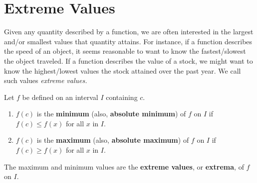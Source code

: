 \section{Extreme Values}\label{sec:extreme_values}


Given any quantity described by a function, we are often interested in the largest and/or smallest values that quantity attains. For instance, if a function describes the speed of an object, it seems reasonable to want to know the fastest/slowest the object traveled. If a function describes the value of a stock, we might want to know the highest/lowest values the stock attained over the past year. We call such values \emph{extreme values.}

\begin{definition}\label{def:extreme_values}%
Let $f$ be defined on an interval $I$ containing $c$.
\begin{enumerate}
	\item	$f(c)$ is the \textbf{minimum} (also, \textbf{absolute minimum}) of $f$ on $I$ if $f(c) \leq f(x)$ for all $x$ in $I$.
	\item	$f(c)$ is the \textbf{maximum} (also, \textbf{absolute maximum}) of $f$ on $I$ if $f(c) \geq f(x)$ for all $x$ in $I$.
\end{enumerate}
The maximum and minimum values are the \textbf{extreme values}, or \textbf{extrema}, of $f$ on $I$.
\end{definition}

